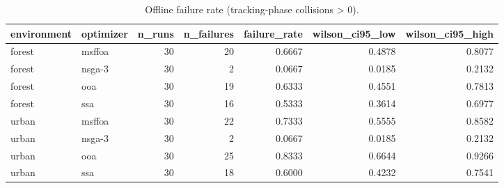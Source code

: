 \begin{table}
\caption{Offline failure rate (tracking-phase collisions > 0).}
\label{tab:failure-rate-offline}
\begin{tabular}{llrrrrr}
\toprule
environment & optimizer & n\_runs & n\_failures & failure\_rate & wilson\_ci95\_low & wilson\_ci95\_high \\
\midrule
forest & msffoa & 30 & 20 & 0.6667 & 0.4878 & 0.8077 \\
forest & nsga-3 & 30 & 2 & 0.0667 & 0.0185 & 0.2132 \\
forest & ooa & 30 & 19 & 0.6333 & 0.4551 & 0.7813 \\
forest & ssa & 30 & 16 & 0.5333 & 0.3614 & 0.6977 \\
urban & msffoa & 30 & 22 & 0.7333 & 0.5555 & 0.8582 \\
urban & nsga-3 & 30 & 2 & 0.0667 & 0.0185 & 0.2132 \\
urban & ooa & 30 & 25 & 0.8333 & 0.6644 & 0.9266 \\
urban & ssa & 30 & 18 & 0.6000 & 0.4232 & 0.7541 \\
\bottomrule
\end{tabular}
\end{table}
